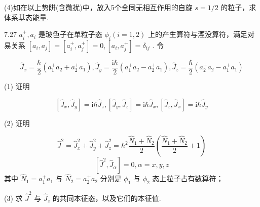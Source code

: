 (4)如在以上势阱(含微扰)中，放入5个全同无相互作用的自旋 $s = 1 / 2$ 的粒子，求体系基态能量.

\vfill\newpage

7.27 $a_{i}^{+}, a_{i}$ 是玻色子在单粒子态 $\phi_{i}(i = 1,2)$ 上的产生算符与湮没算符，满足对易关系 $[a_{i}, a_{j}] = [a_{i}^{+}, a_{j}^{+}] = 0, [a_{i}, a_{j}^{+}] = \delta_{ij}$ . 令

$$
\hat {J} _ {x} = \frac {\hbar}{2} \left(a _ {1} ^ {+} a _ {2} + a _ {2} ^ {+} a _ {1}\right), \hat {J} _ {y} = \frac {\mathrm{i} \hbar}{2} \left(a _ {1} ^ {+} a _ {2} - a _ {2} ^ {+} a _ {1}\right), \hat {J} _ {z} = \frac {\hbar}{2} \left(a _ {2} ^ {+} a _ {2} - a _ {1} ^ {+} a _ {1}\right)
$$

(1) 证明

$$
\left[ \hat {J} _ {x}, \hat {J} _ {y} \right] = \mathrm{i} \hbar \hat {J} _ {z}, \left[ \hat {J} _ {y}, \hat {J} _ {z} \right] = \mathrm{i} \hbar \hat {J} _ {x}, \left[ \hat {J} _ {z}, \hat {J} _ {x} \right] = \mathrm{i} \hbar \hat {J} _ {y}
$$

(2) 证明

$$
\hat {J} ^ {2} = \hat {J} _ {x} ^ {2} + \hat {J} _ {y} ^ {2} + \hat {J} _ {z} ^ {2} = \hbar^ {2} \frac {\hat {N} _ {1} + \hat {N} _ {2}}{2} \left(\frac {\hat {N} _ {1} + \hat {N} _ {2}}{2} + 1\right)
$$
$$
\left[ \hat {J} ^ {2}, \hat {J} _ {\alpha} \right] = 0, \alpha = x, y, z
$$
其中 $\hat{N}_1 = a_1^+ a_1$ 与 $\hat{N}_2 = a_2^+ a_2$ 分别是 $\phi_1$ 与 $\phi_2$ 态上粒子占有数算符；

(3) 求 $\hat{J}^2$ 与 $\hat{J}_z$ 的共同本征态，以及它们的本征值.

\vfill\newpage